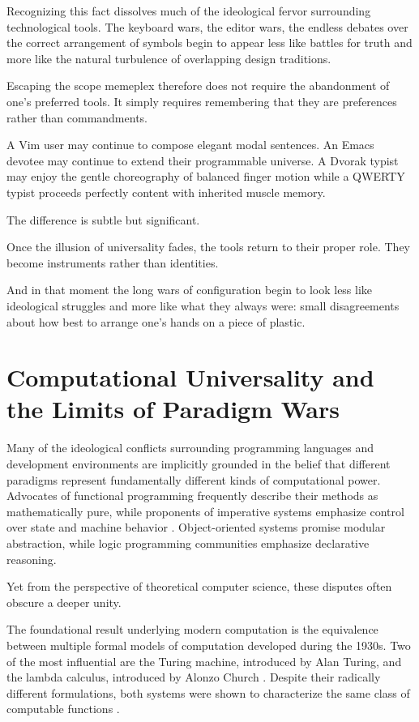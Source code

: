 \documentclass[12pt]{article}
\theoremstyle{definition}
\begin{document}
Recognizing this fact dissolves much of the ideological fervor
surrounding technological tools. The keyboard wars, the editor wars,
the endless debates over the correct arrangement of symbols begin to
appear less like battles for truth and more like the natural turbulence
of overlapping design traditions.

Escaping the scope memeplex therefore does not require the abandonment
of one's preferred tools. It simply requires remembering that they are
preferences rather than commandments.

A Vim user may continue to compose elegant modal sentences. An Emacs
devotee may continue to extend their programmable universe. A Dvorak
typist may enjoy the gentle choreography of balanced finger motion while
a QWERTY typist proceeds perfectly content with inherited muscle memory.

The difference is subtle but significant.

Once the illusion of universality fades, the tools return to their
proper role. They become instruments rather than identities.

And in that moment the long wars of configuration begin to look less
like ideological struggles and more like what they always were: small
disagreements about how best to arrange one's hands on a piece of
plastic.

\section{Computational Universality and the Limits of Paradigm Wars}

Many of the ideological conflicts surrounding programming languages and
development environments are implicitly grounded in the belief that
different paradigms represent fundamentally different kinds of
computational power. Advocates of functional programming frequently
describe their methods as mathematically pure, while proponents of
imperative systems emphasize control over state and machine behavior
\cite{backus1978}. Object-oriented systems promise modular abstraction,
while logic programming communities emphasize declarative reasoning.

Yet from the perspective of theoretical computer science, these disputes
often obscure a deeper unity.

The foundational result underlying modern computation is the equivalence
between multiple formal models of computation developed during the
1930s. Two of the most influential are the Turing machine, introduced
by Alan Turing, and the lambda calculus, introduced by Alonzo Church
\cite{church1936,turing1936}. Despite their radically different
formulations, both systems were shown to characterize the same class
of computable functions \cite{kleene1952}.
\end{document}

